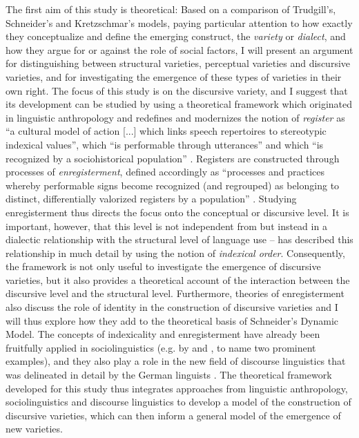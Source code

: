 The first aim of this study is theoretical: Based on a comparison of Trudgill’s, Schneider’s and Kretzschmar’s models, paying particular attention to how exactly they conceptualize and define the emerging construct, the \textit{variety} or \textit{dialect}, and how they argue for or against the role of social factors, I will present an argument for distinguishing between structural varieties, perceptual varieties and discursive varieties, and for investigating the emergence of these types of varieties in their own right. The focus of this study is on the discursive variety, and I suggest that its development can be studied by using a theoretical framework which originated in linguistic anthropology and redefines and modernizes the notion of \textit{register} as “a cultural model of action [...] which links speech repertoires to stereotypic indexical values”, which “is performable through utterances” and which “is recognized by a sociohistorical population” \citep[81]{Agha2007}. Registers are constructed through processes of \textit{enregisterment}, defined accordingly as “processes and practices whereby performable signs become recognized (and regrouped) as belonging to distinct, differentially valorized registers by a population” \citep[81]{Agha2007}. Studying enregisterment thus directs the focus onto the conceptual or discursive level. It is important, however, that this level is not independent from but instead in a dialectic relationship with the structural level of language use – \citet{Silverstein2003} has described this relationship in much detail by using the notion of \textit{indexical order}. Consequently, the framework is not only useful to investigate the emergence of discursive varieties, but it also provides a theoretical account of the interaction between the discursive level and the structural level. Furthermore, theories of enregisterment also discuss the role of identity in the construction of discursive varieties and I will thus explore how they add to the theoretical basis of Schneider’s Dynamic Model. The concepts of indexicality and enregisterment have already been fruitfully applied in sociolinguistics (e.g. by \citealt{Johnstone2006} and \citealt{Eckert2008}, to name two prominent examples), and they also play a role in the new field of discourse linguistics that was delineated in detail by the German linguists \citet{Spitzmuller2011}. The theoretical framework developed for this study thus integrates approaches from linguistic anthropology, sociolinguistics and discourse linguistics to develop a model of the construction of discursive varieties, which can then inform a general model of the emergence of new varieties.

